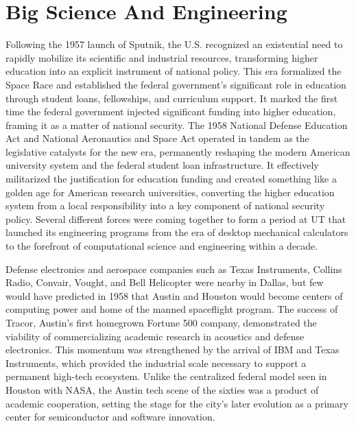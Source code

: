 \section{Big Science And Engineering}

Following the 1957 launch of Sputnik, the U.S. recognized an existential need to rapidly mobilize its scientific and industrial resources, transforming higher education into an explicit instrument of national policy. This era formalized the Space Race and established the federal government's significant role in education through student loans, fellowships, and curriculum support. It marked the first time the federal government injected significant funding into higher education, framing it as a matter of national security. The 1958 National Defense Education Act and National Aeronautics and Space Act operated in tandem as the legislative catalysts for the new era, permanently reshaping the modern American university system and the federal student loan infrastructure. It effectively militarized the justification for education funding and created something like a golden age for American research universities, converting the higher education system from a local responsibility into a key component of national security policy. Several different forces were coming together to form a period at UT that launched its engineering programs from the era of desktop mechanical calculators to the forefront of computational science and engineering within a decade. 

Defense electronics and aerospace companies such as Texas Instruments, Collins Radio, Convair, Vought, and Bell Helicopter were nearby in Dallas, but few would have predicted in 1958 that Austin and Houston would become centers of computing power and home of the manned spaceflight program. The success of Tracor, Austin's first homegrown Fortune 500 company, demonstrated the viability of commercializing academic research in acoustics and defense electronics. This momentum was strengthened by the arrival of IBM and Texas Instruments, which provided the industrial scale necessary to support a permanent high-tech ecosystem. Unlike the centralized federal model seen in Houston with NASA, the Austin tech scene of the sixties was a product of academic cooperation, setting the stage for the city's later evolution as a primary center for semiconductor and software innovation. 

